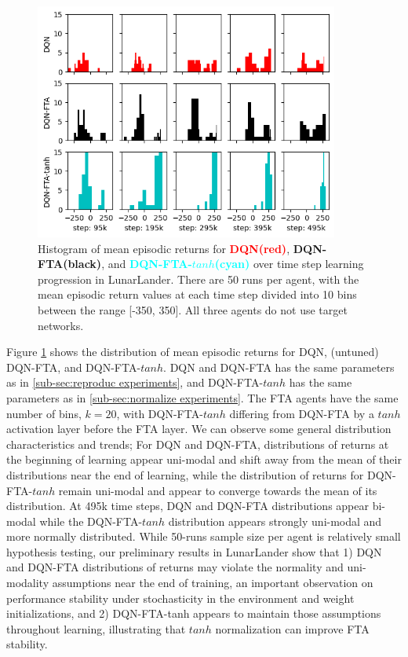 \documentclass{article}
\begin{document}
\begin{figure}[h]
    \centering
    \includegraphics[width=10cm]{distribution.png}
    \caption{Histogram of mean episodic returns for {\textcolor{red} {\bf DQN(red)}}, {\bf DQN-FTA(black)}, and {\textcolor{cyan} {\bf DQN-FTA-$tanh$(cyan)}} over time step learning progression in LunarLander. There are 50 runs per agent, with the mean episodic return values at each time step divided into 10 bins between the range [-350, 350]. All three agents do not use target networks.}
    \label{fig:dist}
\end{figure}

Figure \ref{fig:dist} shows the distribution of mean episodic returns for DQN, (untuned) DQN-FTA, and DQN-FTA-$tanh$. DQN and DQN-FTA has the same parameters as in \ref{sub-sec:reproduc experiments}, and DQN-FTA-$tanh$ has the same parameters as in \ref{sub-sec:normalize experiments}. The FTA agents have the same number of bins, $k=20$, with DQN-FTA-$tanh$ differing from DQN-FTA by a $tanh$ activation layer before the FTA layer. We can observe some general distribution characteristics and trends; For DQN and DQN-FTA, distributions of returns at the beginning of learning appear uni-modal and shift away from the mean of their distributions near the end of learning, while the distribution of returns for DQN-FTA-$tanh$ remain uni-modal and appear to converge towards the mean of its distribution. At 495k time steps, DQN and DQN-FTA distributions appear bi-modal while the DQN-FTA-$tanh$ distribution appears strongly uni-modal and more normally distributed. While 50-runs sample size per agent is relatively small hypothesis testing, our preliminary results in LunarLander show that 1) DQN and DQN-FTA distributions of returns may violate the normality and uni-modality assumptions near the end of training, an important observation on performance stability under stochasticity in the environment and weight initializations, and 2) DQN-FTA-tanh appears to maintain those assumptions throughout learning, illustrating that $tanh$ normalization can improve FTA stability.
\end{document}

